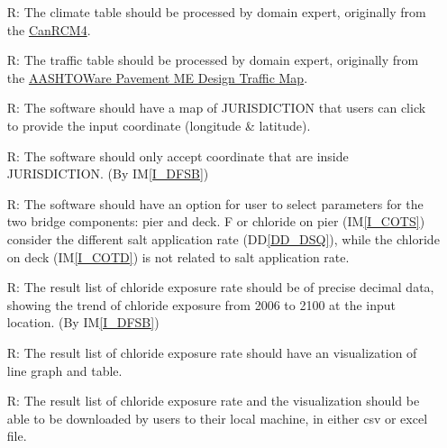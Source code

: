 \documentclass[12pt]{article}
\newcommand{\ddref}[1]{DD\ref{#1}}
\newcommand{\iref}[1]{IM\ref{#1}}
\newcounter{reqnum} %
\begin{document}
\begin{itemize}
\item[R\refstepcounter{reqnum}\thereqnum \label{R_InputClimate}:] The climate table should be processed by domain expert, originally from the \href{https://climate-modelling.canada.ca/climatemodeldata/canrcm/CanRCM4/index.shtml}{CanRCM4}.
 
\item[R\refstepcounter{reqnum}\thereqnum \label{R_InputTraffic}:] The traffic table should be processed by domain expert, originally from the \href{https://icorridor-mto-on-ca.hub.arcgis.com/apps/50798e771bd0440dbc96fd85d8fde9a5/explore}{AASHTOWare Pavement ME Design Traffic Map}.
\item[R\refstepcounter{reqnum}\thereqnum \label{R_InputMap}:] The software should have a map of JURISDICTION that users can click to provide the input coordinate (longitude \& latitude).

\item[R\refstepcounter{reqnum}\thereqnum \label{R_Inputs}:] The software should only accept coordinate that are inside JURISDICTION. (By \iref{I_DFSB})

\item[R\refstepcounter{reqnum}\thereqnum \label{R_Parameter}:] The software should have an option for user to select parameters for the two bridge components: pier and deck. F or chloride on pier (\iref{I_COTS}) consider the different salt application rate (\ddref{DD_DSQ}), while the chloride on deck (\iref{I_COTD}) is not related to salt application rate.


\item[R\refstepcounter{reqnum}\thereqnum \label{R_OutputInputs}:] The result list of chloride exposure rate should be of precise decimal data, showing the trend of chloride exposure from 2006 to 2100 at the input location. (By \iref{I_DFSB})

\item[R\refstepcounter{reqnum}\thereqnum \label{R_OutputVisualization}:] The result list of chloride exposure rate should have an visualization of line graph and table.

\item[R\refstepcounter{reqnum}\thereqnum \label{R_OutputDownload}:] The result list of chloride exposure rate and the visualization should be able to be downloaded by users to their local machine, in either csv or excel file. 


\end{itemize}
\end{document}
